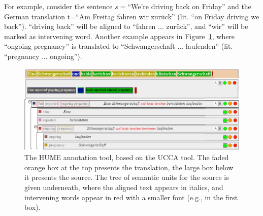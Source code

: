 \documentclass[11pt]{article}
\newcommand{\figref}[1]{Figure~\ref{#1}}
\newcommand{\bh}[1]{}
\begin{document}
For example, consider the sentence $s=$``We're driving back on Friday'' and the German
translation t=``Am Freitag fahren wir zur\"uck'' (lit. ``on Friday driving we back'').
``driving back'' will be aligned to ``fahren ... zur\"uck'',
and ``wir'' will be marked as intervening word. Another example
appears in \figref{fig:interface}, where ``ongoing pregnancy'' is translated to
``Schwangerschaft ... laufenden'' (lit. ``pregnancy ... ongoing'').






\begin{figure}[t]
    \begin{center}
    \includegraphics[width=1\textwidth]{hume_interface2.jpg}
    \caption{The HUME annotation tool, based on the UCCA tool. The faded orange box at the top
      presents the translation, the large box below it presents the source. The tree of semantic units
      for the source is given underneath, where the aligned text appears in italics, and intervening words
      appear in red with a smaller font (e.g., in the first box).}
    \label{fig:interface}
    \end{center}
\end{figure}
\end{document}
